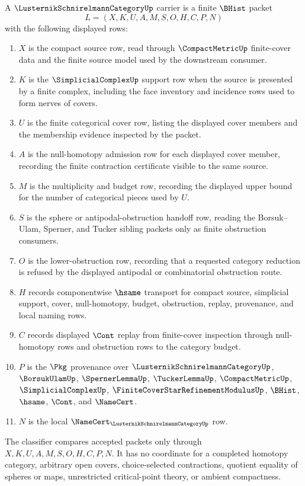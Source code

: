\begin{definition}
\label{def:lusternik-schnirelmann-category-carrier}
A $\LusternikSchnirelmannCategoryUp$ carrier is a finite $\BHist$ packet
$$
L=(X,K,U,A,M,S,O,H,C,P,N)
$$
with the following displayed rows:
\begin{enumerate}
\item $X$ is the compact source row, read through $\CompactMetricUp$ finite-cover data and the finite source model used by the downstream consumer.
\item $K$ is the $\SimplicialComplexUp$ support row when the source is presented by a finite complex, including the face inventory and incidence rows used to form nerves of covers.
\item $U$ is the finite categorical cover row, listing the displayed cover members and the membership evidence inspected by the packet.
\item $A$ is the null-homotopy admission row for each displayed cover member, recording the finite contraction certificate visible to the same source.
\item $M$ is the multiplicity and budget row, recording the displayed upper bound for the number of categorical pieces used by $U$.
\item $S$ is the sphere or antipodal-obstruction handoff row, reading the Borsuk--Ulam, Sperner, and Tucker sibling packets only as finite obstruction consumers.
\item $O$ is the lower-obstruction row, recording that a requested category reduction is refused by the displayed antipodal or combinatorial obstruction route.
\item $H$ records componentwise $\hsame$ transport for compact source, simplicial support, cover, null-homotopy, budget, obstruction, replay, provenance, and local naming rows.
\item $C$ records displayed $\Cont$ replay from finite-cover inspection through null-homotopy rows and obstruction rows to the category budget.
\item $P$ is the $\Pkg$ provenance over $\LusternikSchnirelmannCategoryUp$, $\BorsukUlamUp$, $\SpernerLemmaUp$, $\TuckerLemmaUp$, $\CompactMetricUp$, $\SimplicialComplexUp$, $\FiniteCoverStarRefinementModulusUp$, $\BHist$, $\hsame$, $\Cont$, and $\NameCert$.
\item $N$ is the local $\NameCert_{\LusternikSchnirelmannCategoryUp}$ row.
\end{enumerate}
The classifier compares accepted packets only through $X,K,U,A,M,S,O,H,C,P,N$. It has no coordinate for a completed homotopy category, arbitrary open covers, choice-selected contractions, quotient equality of spheres or maps, unrestricted critical-point theory, or ambient compactness.
\end{definition}

